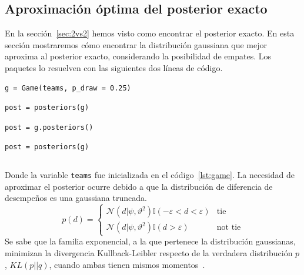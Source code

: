 \documentclass[a4paper,11pt]{book}
\newcommand{\N}{\mathcal{N}}
\theoremstyle{definition}
\begin{document}
\subsection{Aproximaci\'on \'optima del posterior exacto} \label{sec:approximate_posterior}
%
En la secci\'on~\ref{sec:2vs2} hemos visto como encontrar el posterior exacto.
%
En esta secci\'on mostraremos c\'omo encontrar la distribuci\'on gaussiana que mejor aproxima al posterior exacto, considerando la posibilidad de empates.
%
Los paquetes lo resuelven con las siguientes dos l\'ineas de c\'odigo.
%
\begin{lstlisting}[backgroundcolor=\color{all},belowskip=-0.77 \baselineskip]
g = Game(teams, p_draw = 0.25)
\end{lstlisting}
\begin{paracol}{3}
\begin{lstlisting}[backgroundcolor=\color{julia!60}, belowskip=0cm]
post = posteriors(g)
\end{lstlisting}
\switchcolumn
\begin{lstlisting}[backgroundcolor=\color{python!60}, belowskip=0cm]
post = g.posteriors()
\end{lstlisting}
\switchcolumn
\begin{lstlisting}[backgroundcolor=\color{r!50}, belowskip=0cm]
post = posteriors(g)
\end{lstlisting}
\end{paracol}
\begin{lstlisting}[captionpos=b,backgroundcolor=\color{white}, label=lst:post_2vs2, caption={Computando el posterior aproximado}, belowskip=0cm, aboveskip=0cm]
\end{lstlisting}
%
Donde la variable \texttt{teams} fue inicializada en el c\'odigo~\ref{lst:game}.
%
La necesidad de aproximar el posterior ocurre debido a que la distribuci\'on de diferencia de desempeños es una gaussiana truncada.
%
\begin{equation}\label{eq:p_d}
p(d) =
\begin{cases}
\N(d|\psi,\vartheta^2) \mathbb{I}(-\varepsilon < d < \varepsilon) & \text{tie} \\
\N(d|\psi,\vartheta^2) \mathbb{I}(d > \varepsilon) & \text{not tie}
\end{cases}
\end{equation}
%
Se sabe que la familia exponencial, a la que pertenece la distribuci\'on gaussianas, minimizan la divergencia Kullback-Leibler respecto de la verdadera distribuci\'on $p$, $KL(p||q)$, cuando ambas tienen mismos momentos~\cite{Minka2005}.
\end{document}
